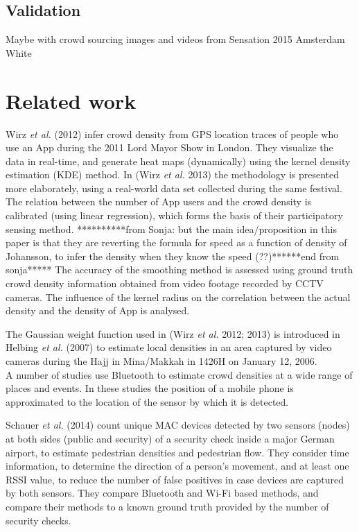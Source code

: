 \documentclass[10pt,a4paper]{article}
\begin{document}
\subsection{Validation}
Maybe with crowd sourcing images and videos from Sensation 2015 Amsterdam White


\section{Related work}

Wirz \textit{et al.} (2012) \cite{wirz:1} infer crowd density from GPS location traces of people who use an App during the 2011 Lord Mayor Show in London. They visualize the data in real-time, and generate heat maps (dynamically) using the kernel density estimation (KDE) method. In (Wirz \textit{et al.} 2013) \cite{wirz:2} the methodology is presented more elaborately, using a real-world data set collected during the same festival. The relation between the number of App users and the crowd density is calibrated (using linear regression), which forms the basis of their participatory sensing method. **********from Sonja: but the main idea/proposition in this paper is that they are reverting the formula for speed as a function of density of Johansson, to infer the density when they know the speed (??)******end from sonja*****
The accuracy of the smoothing method is assessed using ground truth crowd density information obtained from video footage recorded by CCTV cameras. 
The influence of the kernel radius on the correlation between the actual density and the density of App is analysed.

The Gaussian weight function used in (Wirz \textit{et al.} 2012; 2013) \cite{wirz:1}\cite{wirz:2} is introduced in Helbing \textit{et al.} (2007) \cite{helbing:1} to estimate local densities in an area captured by video cameras during the Hajj in Mina/Makkah in 1426H on January 12, 2006.\\

A number of studies use Bluetooth to estimate crowd densities at a wide range of places and events.
In these studies the position of a mobile phone is approximated to the location of the sensor by which it is detected.

Schauer \textit{et al.} (2014) \cite{schauer:1} count unique MAC devices detected by two sensors (nodes) at both sides (public and security) of a security check inside a major German airport, to estimate pedestrian densities and pedestrian flow. They consider time information, to determine the direction of a person's movement, and at least one RSSI value, to reduce the number of false positives in case devices are captured by both sensors. They compare Bluetooth and Wi-Fi based methods, and compare their methods to a known ground truth provided by the number of security checks.
\end{document}

